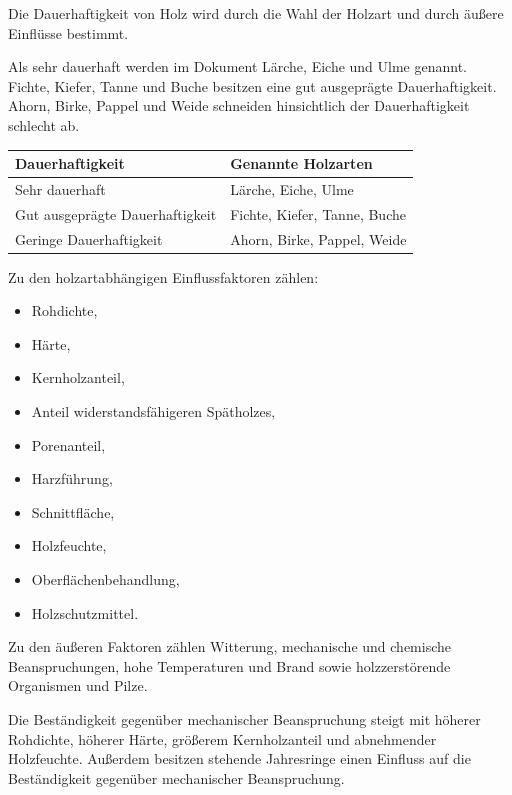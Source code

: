 \documentclass[
  12pt,
  a4paper,
  oneside
]{scrreprt}
\begin{document}
Die Dauerhaftigkeit von Holz wird durch die Wahl der Holzart und durch
äußere Einflüsse bestimmt. 

Als sehr dauerhaft werden im Dokument Lärche, Eiche und Ulme genannt.
Fichte, Kiefer, Tanne und Buche besitzen eine gut ausgeprägte
Dauerhaftigkeit. Ahorn, Birke, Pappel und Weide schneiden hinsichtlich
der Dauerhaftigkeit schlecht ab. 

\begin{longtable}{
  >{\raggedright\arraybackslash}p{}
  >{\raggedright\arraybackslash}p{}
}
\toprule
\textbf{Dauerhaftigkeit} &
\textbf{Genannte Holzarten} \\
\midrule
\endhead

Sehr dauerhaft &
Lärche, Eiche, Ulme \\

Gut ausgeprägte Dauerhaftigkeit &
Fichte, Kiefer, Tanne, Buche \\

Geringe Dauerhaftigkeit &
Ahorn, Birke, Pappel, Weide \\

\bottomrule
\end{longtable}



Zu den holzartabhängigen Einflussfaktoren zählen:

\begin{itemize}
  \item Rohdichte,
  \item Härte,
  \item Kernholzanteil,
  \item Anteil widerstandsfähigeren Spätholzes,
  \item Porenanteil,
  \item Harzführung,
  \item Schnittfläche,
  \item Holzfeuchte,
  \item Oberflächenbehandlung,
  \item Holzschutzmittel.
\end{itemize}



Zu den äußeren Faktoren zählen Witterung, mechanische und chemische
Beanspruchungen, hohe Temperaturen und Brand sowie holzzerstörende
Organismen und Pilze. 

Die Beständigkeit gegenüber mechanischer Beanspruchung steigt mit
höherer Rohdichte, höherer Härte, größerem Kernholzanteil und
abnehmender Holzfeuchte. Außerdem besitzen stehende Jahresringe einen
Einfluss auf die Beständigkeit gegenüber mechanischer Beanspruchung.
\end{document}
